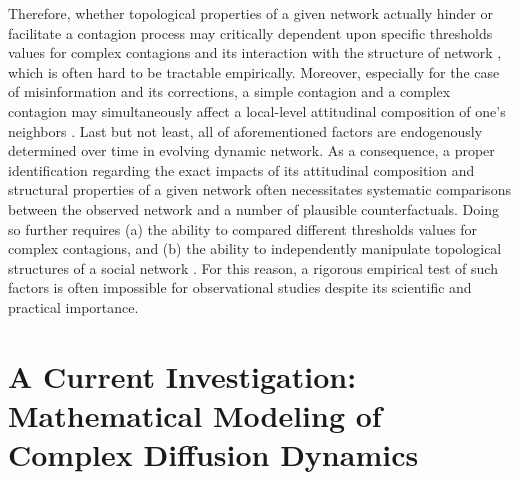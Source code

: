 \documentclass[man, 12pt, a4paper, nolmodern, noextraspace]{apa6}
\begin{document}
    Therefore, whether topological properties of a given network actually hinder or facilitate a contagion process may critically dependent upon specific thresholds values for complex contagions and its interaction with the structure of network \parencite[e.g.,][]{Centola2007449}, which is often hard to be tractable empirically. Moreover, especially for the case of misinformation and its corrections, a simple contagion and a complex contagion may simultaneously affect a local-level attitudinal composition of one's neighbors \parencite[i.e., those who endorse and believe misinformation vs. those who do not: e.g.,][]{campbell2013complex}. Last but not least, all of aforementioned factors are endogenously determined over time in evolving dynamic network. As a consequence, a proper identification regarding the exact impacts of its attitudinal composition and structural properties of a given network often necessitates systematic comparisons between the observed network and a number of plausible counterfactuals. Doing so further requires (a) the ability to compared different thresholds values for complex contagions, and (b) the ability to independently manipulate topological structures of a social network \parencite[e.g.,][]{Centola2010Sience, gonzalez2017decoding}. For this reason, a rigorous empirical test of such factors is often impossible for observational studies despite its scientific and practical importance.
    
\section{A Current Investigation: Mathematical Modeling of Complex Diffusion Dynamics} 
\end{document}
